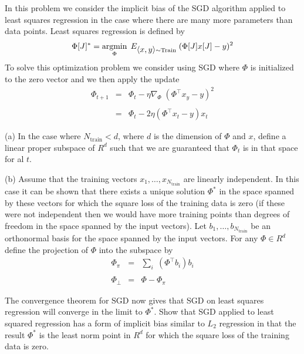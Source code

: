 \documentclass{article}
\newcommand{\solution}[1]{}
\begin{document}
\medskip
In this problem we consider the implicit bias of the SGD algorithm applied to least squares regression in the case where there are many more parameters than data points.
Least squares regression is defined by
$$\Phi[J]^* = \operatorname*{argmin}_\Phi \; E_{{\mbox{$\langle x,y\rangle$}} \sim \mathrm{Train}}\;(\Phi[J]x[J] - y)^2$$
To solve this optimization problem we consider using SGD where $\Phi$ is initialized to the zero vector and we then apply the update
\begin{eqnarray*}
  \Phi_{t+1} & = & \Phi_t - \eta \nabla_\Phi\;(\Phi^\top x_y - y)^2 \\
  \\
  & = & \Phi_t - 2 \eta (\Phi^\top x_t - y)x_t
\end{eqnarray*}

\medskip
(a) In the case where $N_{\mathrm{train}} < d$, where $d$ is the dimension of $\Phi$ and $x$, define a linear proper subspace of $R^d$ such that we are guaranteed
that $\Phi_t$ is in that space for al $t$.

\solution{
  Since every update is in the direction of some input vector $x_t$ in the training data, SGD maintains the invariant that $\Phi_t$ is some linear combination
  of the training vectors $x_1,\ldots x_{N_{\mathrm{train}}}$. Since $N_{\mathrm{train}} < d$ the span of the training vectors must be a proper subspace of $R^d$.
}

(b) Assume that the training vectors $x_1,\ldots,x_{N_{\mathrm{train}}}$ are linearly independent.  In this case it can be shown that there exists a unique solution $\Phi^*$ in the space
spanned by these vectors for which the square loss of the training data is zero (if these were not independent then we would have more training points than degrees of freedom
in the space spanned by the input vectors). Let $b_1,\ldots,b_{N_{\mathrm{train}}}$ be an orthonormal basis
for the space spanned by the input vectors. For any $\Phi \in R^d$ define the projection of $\Phi$ into the subspace by
\begin{eqnarray*}
  \Phi_\pi & = & \sum_i\;(\Phi^\top b_i)b_i \\
  \\
  \Phi_\bot & = & \Phi - \Phi_\pi
\end{eqnarray*}

The convergence theorem for SGD now gives that SGD on least squares regression will converge in the limit to $\Phi^*$.  Show that SGD applied to least
squared regression has a form of implicit bias similar to $L_2$ regression in that the result $\Phi^*$ is the least norm point in $R^d$ for which
the square loss of the training data is zero.
\end{document}
